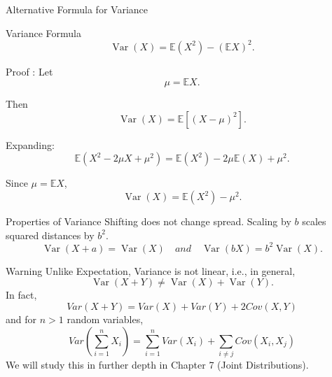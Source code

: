 \begin{frame}{Alternative Formula for Variance}
\begin{keybox}{Variance Formula}
\[
\boxed{
\operatorname{Var}(X)
=
\mathbb{E}(X^2)-(\mathbb{E}X)^2.
}
\]
\end{keybox}

\vspace{0.25cm}

Proof :
Let
\[
\mu=\mathbb{E}X.
\]

Then
\[
\operatorname{Var}(X)
=
\mathbb{E}\left[(X-\mu)^2\right].
\]

Expanding:
\[
\mathbb{E}(X^2-2\mu X+\mu^2)
=
\mathbb{E}(X^2)-2\mu\mathbb{E}(X)+\mu^2.
\]

Since $\mu=\mathbb{E}X$,
\[
\operatorname{Var}(X)=\mathbb{E}(X^2)-\mu^2.
\]
\end{frame}

\begin{frame}{Properties of Variance}
Shifting does not change spread. Scaling by $b$ scales squared distances by $b^2$.
\[
\boxed{
\operatorname{Var}(X+a)=\operatorname{Var}(X) \quad and \quad \operatorname{Var}(bX)=b^2\operatorname{Var}(X).
}
\]
\begin{keybox}{Warning}
Unlike Expectation, Variance is not linear, i.e., in general,
\[
\operatorname{Var}(X+Y)
\neq
\operatorname{Var}(X)+\operatorname{Var}(Y).
\]
 In fact, 
\begin{equation}
    Var(X+Y) = Var(X) + Var(Y) + 2Cov(X,Y)
\end{equation}
and for $n>1$ random variables,
\begin{equation}
    Var(\sum_{i=1}^nX_i) = \sum_{i=1}^n Var(X_i) + \sum_{i\neq j}Cov(X_i,X_j)
\end{equation}
We will study this in further depth in Chapter 7 (Joint Distributions).
\end{keybox}
\end{frame}



